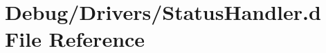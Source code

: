 \hypertarget{StatusHandler_8d}{}\section{Debug/\+Drivers/\+Status\+Handler.d File Reference}
\label{StatusHandler_8d}

